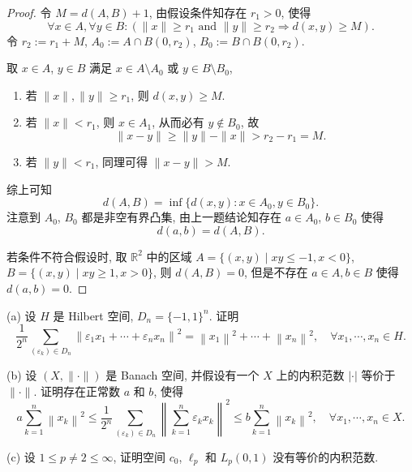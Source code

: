\begin{proof}
  令 $M = d(A, B) + 1$, 由假设条件知存在 $r_1>0$, 使得
  \[\forall x\in A, \forall y\in B :
    (\|x\|\geq r_1 \text{ and } \|y\|\geq r_2 \Longrightarrow d(x,y)\geq M).\]
  令 $r_2 := r_1 + M$, $A_0 := A\cap B(0, r_2)$, $B_0 := B\cap B(0, r_2)$.

  取 $x\in A$, $y\in B$ 满足 $x\in A\setminus A_0$ 或 $y\in B\setminus B_0$,
  \begin{enumerate}[(1)]
    \item 若 $\|x\|, \|y\|\geq r_1$, 则 $d(x,y) \geq M$.
    \item 若 $\|x\| < r_1$, 则 $x\in A_1$, 从而必有 $y\notin B_0$, 故
      \[\|x - y\| \geq \|y\| - \|x\| > r_2 - r_1 = M.\]
    \item 若 $\|y\| < r_1$, 同理可得 $\|x-y\| > M$.
  \end{enumerate}
  综上可知
  \[d(A,B) = \inf\{d(x,y) : x\in A_0, y\in B_0\}.\]
  注意到 $A_0$, $B_0$ 都是非空有界凸集, 由上一题结论知存在 $a\in A_0$, $b\in B_0$ 使得
  \[d(a,b) = d(A,B).\]
  
  若条件不符合假设时, 取 $\mathbb{R}^2$ 中的区域 $A=\{(x,y)\mid xy\leq -1, x < 0\}$,
  $B=\{(x,y) \mid xy\geq 1, x > 0\}$, 
  则 $d(A,B)=0$, 但是不存在 $a\in A,b\in B$ 使得 $d(a,b)=0$.
\end{proof}


\begin{exercise}
    (a) 设 $H$ 是 Hilbert 空间, $D_{n}=\{-1,1\}^{n}$. 证明
    \[
    \frac{1}{2^{n}} \sum_{(\varepsilon_{k}) \in D_{n}}\left\|\varepsilon_{1} x_{1}+\cdots+\varepsilon_{n} x_{n}\right\|^{2}=\left\|x_{1}\right\|^{2}+\cdots+\left\|x_{n}\right\|^{2}, \quad \forall x_1,\cdots,x_n \in H.
    \]

    (b) 设 $(X,\|\cdot\|)$ 是 Banach 空间, 并假设有一个 $X$ 上的内积范数 $|\cdot|$ 
    等价于 $\|\cdot\|$. 证明存在正常数 $a$ 和 $b$, 使得
    \[
      a\sum_{k=1}^{n}\left\|x_{k}\right\|^{2}
      \leq\frac{1}{2^{n}} \sum_{\left(\varepsilon_{k}\right) \in D_{n}}
        \left\|\sum_{k=1}^{n} \varepsilon_{k} x_{k}\right\|^{2}
      \leq b \sum_{k=1}^{n}\left\|x_{k}\right\|^{2}, \quad \forall x_{1}, \cdots, x_{n} \in X.
    \]

    (c) 设 $1 \leq p \neq 2 \leq \infty$, 证明空间 $c_{0}$, $\ell_{p}$ 和 $L_{p}(0,1)$
    没有等价的内积范数.
\end{exercise}

